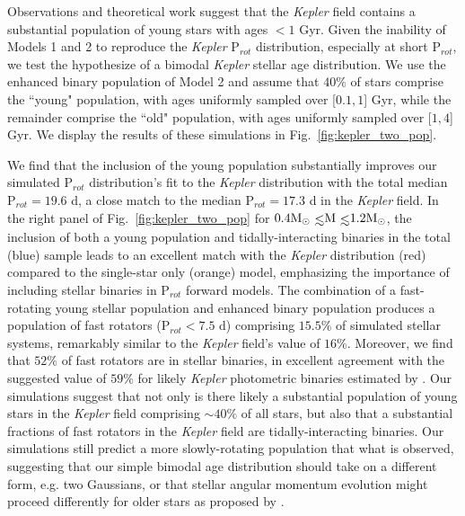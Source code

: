\documentclass[twocolumn]{aastex61}
\def\lsim{~\rlap{$<$}{\lower 1.0ex\hbox{$\sim$}}}
\begin{document}
Observations \citep{McQuillan2014,Davenport2017} and theoretical work \citep{Matt2015} suggest that the \textit{Kepler} field contains a substantial population of young stars with ages $< 1$ Gyr.  Given the inability of Models 1 and 2 to reproduce the \textit{Kepler} P$_{rot}$ distribution, especially at short P$_{rot}$, we test the hypothesize of a bimodal \textit{Kepler} stellar age distribution. We use the enhanced binary population of Model 2 and assume that $40\%$ of stars comprise the ``young" population, with ages uniformly sampled over [$0.1,1$] Gyr, while the remainder comprise the ``old" population, with ages uniformly sampled over [$1,4$] Gyr.  We display the results of these simulations in Fig.~\ref{fig:kepler_two_pop}.

We find that the inclusion of the young population substantially improves our simulated P$_{rot}$ distribution's fit to the \textit{Kepler} distribution with the total median P$_{rot} = 19.6$ d, a close match to the median P$_{rot} = 17.3$ d in the \textit{Kepler} field. In the right panel of Fig.~\ref{fig:kepler_two_pop} for $ 0.4 \textrm{M}_{\odot} \lsim \textrm{M} \lsim 1.2 \textrm{M}_{\odot}$, the inclusion of both a young population and tidally-interacting binaries in the total (blue) sample leads to an excellent match with the \textit{Kepler} distribution (red) compared to the single-star only (orange) model, emphasizing the importance of including stellar binaries in P$_{rot}$ forward models. The combination of a fast-rotating young stellar population and enhanced binary population produces a population of fast rotators (P$_{rot} < 7.5$ d) comprising $15.5\%$ of simulated stellar systems, remarkably similar to the \textit{Kepler} field's value of $16\%$.  Moreover, we find that $52\%$ of fast rotators are in stellar binaries, in excellent agreement with the suggested value of $59\%$ for likely \textit{Kepler} photometric binaries estimated by \citet{Simonian2018}.  Our simulations suggest that not only is there likely a substantial population of young stars in the \textit{Kepler} field comprising $\sim 40\%$ of all stars, but also that a substantial fractions of fast rotators in the \textit{Kepler} field are tidally-interacting binaries. Our simulations still predict a more slowly-rotating population that what is observed, suggesting that our simple bimodal age distribution should take on a different form, e.g. two Gaussians, or that stellar angular momentum evolution might proceed differently for older stars as proposed by \citet[e.g.][]{vanSaders2016,vanSaders2018}.
\end{document}
